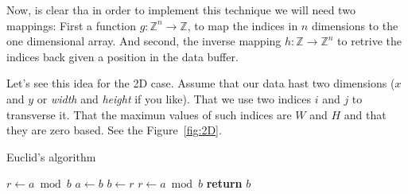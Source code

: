 Now, is clear tha in order to implement this technique we will need two mappings: First a function $g:\mathbb{Z}^n \rightarrow \mathbb{Z}$, to map the indices in $n$ dimensions to the one dimensional array. And second, the inverse mapping $h:\mathbb{Z} \rightarrow \mathbb{Z}^n$ to retrive the indices back given a position in the data buffer.

Let's see this idea for the 2D case. Assume that our data hast two dimensions ($x$ and $y$ or \emph{width} and \emph{height} if you like). That we use two indices $i$ and $j$ to transverse it. That the maximun values of such indices are $W$ and $H$ and that they are zero based. See the Figure~\ref{fig:2D}.

{\centering
\begin{minipage}{\linewidth}
  \begin{algorithm}[H]
    \caption{Euclid's algorithm}
    \label{alg:euclid}
    \begin{algorithmic}[1] %
       
        \State $r\gets a \bmod b$
         
          \State $a \gets b$
          \State $b \gets r$
          \State $r \gets a \bmod b$
        \EndWhile\label{euclidendwhile}
        \State \textbf{return} $b$
      \EndProcedure
    \end{algorithmic}
  \end{algorithm}
\end{minipage}
\par
}

